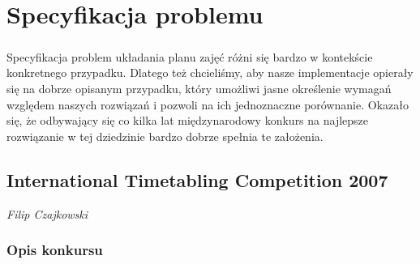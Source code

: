 \chapter{Specyfikacja problemu}
\paragraph{}Specyfikacja problem układania planu zajęć różni się bardzo w kontekście konkretnego przypadku. Dlatego też chcieliśmy, aby nasze implementacje opierały się na dobrze opisanym przypadku, który umożliwi jasne określenie wymagań względem naszych rozwiązań i pozwoli na ich jednoznaczne porównanie. Okazało się, że odbywający się co kilka lat międzynarodowy konkurs na najlepsze rozwiązanie w tej dziedzinie bardzo dobrze spełnia te założenia.
\section{International Timetabling Competition 2007}
\textit{Filip Czajkowski} \\
\subsection{Opis konkursu}
